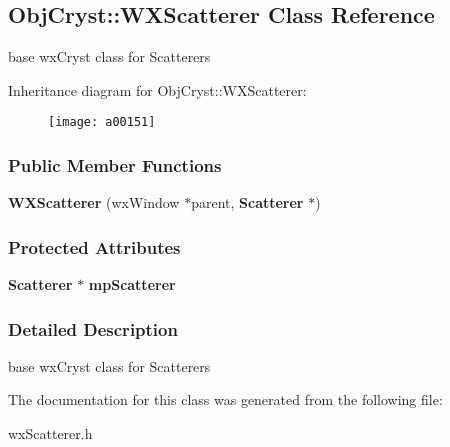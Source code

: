 \subsection{Obj\+Cryst\+:\+:W\+X\+Scatterer Class Reference}
\label{a00151}


base wx\+Cryst class for Scatterers  


Inheritance diagram for Obj\+Cryst\+:\+:W\+X\+Scatterer\+:\begin{figure}[H]
\begin{center}
\leavevmode
\texttt{[image: a00151]}
\end{center}
\end{figure}
\subsubsection*{Public Member Functions}
\begin{DoxyCompactItemize}
\item 
{\bfseries W\+X\+Scatterer} (wx\+Window $\ast$parent, {\bf Scatterer} $\ast$)\label{a00151_a43a37c79f9dca837a55fe024a06fddd6}

\end{DoxyCompactItemize}
\subsubsection*{Protected Attributes}
\begin{DoxyCompactItemize}
\item 
{\bf Scatterer} $\ast$ {\bfseries mp\+Scatterer}\label{a00151_a60b8f362b1735a8942e2991994d5c862}

\end{DoxyCompactItemize}


\subsubsection{Detailed Description}
base wx\+Cryst class for Scatterers 

The documentation for this class was generated from the following file\+:\begin{DoxyCompactItemize}
\item 
wx\+Scatterer.\+h\end{DoxyCompactItemize}
